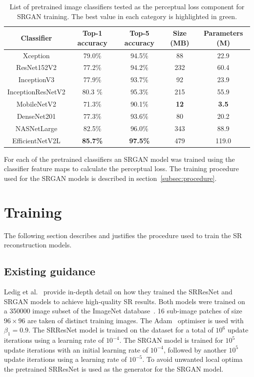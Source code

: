 \begin{table}
    \centering
    \begin{tabular}{ccccc}
        \toprule
        \textbf{Classifier} & \textbf{Top-1 accuracy} & \textbf{Top-5 accuracy} & \textbf{Size (MB)} & \textbf{Parameters (M)} \\
        \midrule
        Xception & 79.0\% & 94.5\% & 88 & 22.9 \\
        ResNet152V2 & 77.2\% & 94.2\% & 232 & 60.4 \\
        InceptionV3 & 77.9\% & 93.7\% & 92 & 23.9 \\
        InceptionResNetV2 & 80.3 \% & 95.3\% & 215 & 55.9 \\
        MobileNetV2 & 71.3\% & 90.1\% & \textbf{12} & \textbf{3.5} \\
        DenseNet201 & 77.3\% & 93.6\% & 80 & 20.2 \\
        NASNetLarge & 82.5\% & 96.0\% & 343 & 88.9 \\
    EfficientNetV2L & \textbf{85.7\%} & \textbf{97.5\%} & 479 & 119.0 \\
        \bottomrule
    \end{tabular}
    \caption{List of pretrained image classifiers tested as the perceptual loss component for SRGAN training. The best value in each category is highlighted in green.}
    \label{table:pretrained_classifiers}
\end{table}

For each of the pretrained classifiers an SRGAN model was trained using the classifier feature maps to calculate the perceptual loss. The training procedure used for the SRGAN models is described in section~\ref{subsec:procedure}.

\section{Training}
The following section describes and justifies the procedure used to train the SR reconstruction models.

\subsection{Existing guidance}
Ledig et al.~\cite{srgan} provide in-depth detail on how they trained the SRResNet and SRGAN models to achieve high-quality SR results. Both models were trained on a 350000 image subset of the ImageNet database~\cite{imageNet}. 16 sub-image patches of size $96 \times 96$ are taken of distinct training images. The Adam~\cite{adamOptimiser} optimiser is used with $\beta_1 = 0.9$. The SRResNet model is trained on the dataset for a total of $10^6$ update iterations using a learning rate of $10^{-4}$. The SRGAN model is trained for $10^5$ update iterations with an initial learning rate of $10^{-4}$, followed by another $10^5$ update iterations using a learning rate of $10^{-5}$. To avoid unwanted local optima the pretrained SRResNet is used as the generator for the SRGAN model.

